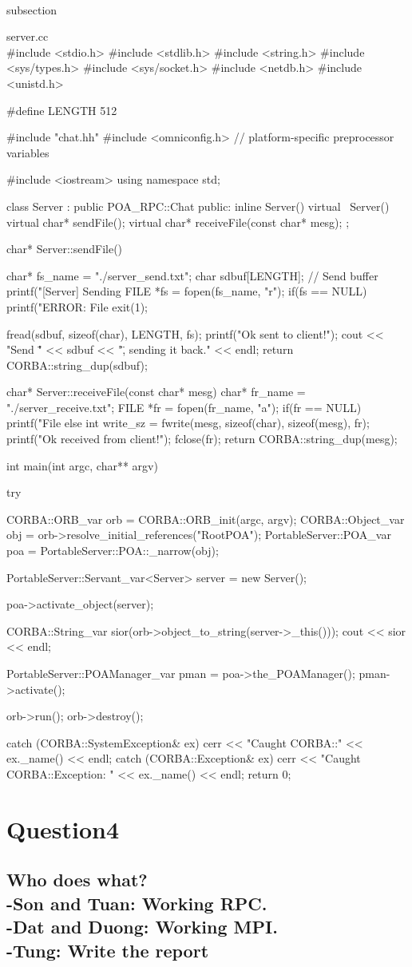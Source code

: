 \documentclass{article}
\begin{document}
 \\subsection{server.cc\\
 #include <stdio.h>
#include <stdlib.h>
#include <string.h>
#include <sys/types.h>
#include <sys/socket.h>
#include <netdb.h>
#include <unistd.h>

#define LENGTH 512

#include "chat.hh"
#include <omniconfig.h>			// platform-specific preprocessor variables

#include <iostream> 
using namespace std;

class Server : public POA_RPC::Chat
{
public:
  inline Server() {}
  virtual ~Server() {}
  virtual char* sendFile();
  virtual char* receiveFile(const char* mesg);
};

char* Server::sendFile()
{
    char* fs_name = "./server_send.txt";
    char sdbuf[LENGTH]; // Send buffer
    printf("[Server] Sending %
    FILE *fs = fopen(fs_name, "r");
    if(fs == NULL)
    {
        printf("ERROR: File %
        exit(1);
    }

    fread(sdbuf, sizeof(char), LENGTH, fs);
    printf("Ok sent to client!\n");
    cout << "Send \"" << sdbuf << "\", sending it back." << endl;
    return CORBA::string_dup(sdbuf);
}

char* Server::receiveFile(const char* mesg)
{
    char* fr_name = "./server_receive.txt";
    FILE *fr = fopen(fr_name, "a");
    if(fr == NULL)
        printf("File %
    else
    {
        int write_sz = fwrite(mesg, sizeof(char), sizeof(mesg), fr);
        printf("Ok received from client!\n");
        fclose(fr);
    }
  return CORBA::string_dup(mesg);
}

int main(int argc, char** argv)
{
	try {
		CORBA::ORB_var          orb = CORBA::ORB_init(argc, argv);
		CORBA::Object_var       obj = orb->resolve_initial_references("RootPOA");
		PortableServer::POA_var poa = PortableServer::POA::_narrow(obj);

		PortableServer::Servant_var<Server> server = new Server();

		poa->activate_object(server);

		CORBA::String_var sior(orb->object_to_string(server->_this()));
		cout << sior << endl;

	 	PortableServer::POAManager_var pman = poa->the_POAManager();
		pman->activate();

		orb->run();
		orb->destroy();
	}
	catch (CORBA::SystemException& ex) {
	    cerr << "Caught CORBA::" << ex._name() << endl;
	}
	catch (CORBA::Exception& ex) {
	    cerr << "Caught CORBA::Exception: " << ex._name() << endl;
	}
	return 0;
}
}
\section{Question4}
\subsection{Who does what?\\
-Son and Tuan: Working RPC.\\
-Dat and Duong: Working MPI.\\
-Tung: Write the report}
\end{document}

